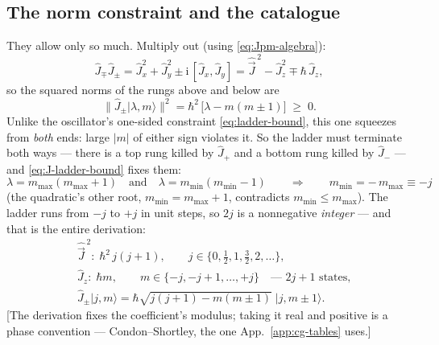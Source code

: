 \documentclass[11pt]{article}
\theoremstyle{plain}
\theoremstyle{definition}
\theoremstyle{remark}
\newcommand{\ii}{\mathrm{i}}
\newcommand{\op}[1]{\hat{#1}}
\newcommand{\ket}[1]{\lvert #1 \rangle}
\begin{document}
\subsection{The norm constraint and the catalogue}
\label{sec:J-spectrum-derivation}

They allow only so much. Multiply out (using
\eqref{eq:Jpm-algebra}):
\begin{equation}
  \op J_\mp\op J_\pm
  = \op J_x^2 + \op J_y^2
    \pm \ii\,[\op J_x, \op J_y]
  = \op{\vec J}^{\,2} - \op J_z^2 \mp \hbar\,\op J_z ,
\end{equation}
so the squared norms of the rungs above and below are
\begin{equation}
  \bigl\|\op J_\pm\ket{\lambda, m}\bigr\|^2
  = \hbar^2\,\bigl[\lambda - m(m \pm 1)\bigr]
  \;\ge\; 0 .
  \label{eq:J-ladder-bound}
\end{equation}
Unlike the oscillator's one-sided constraint
\eqref{eq:ladder-bound}, this one squeezes from \emph{both} ends:
large $|m|$ of either sign violates it. So the ladder must
terminate both ways --- there is a top rung killed by $\op J_+$ and
a bottom rung killed by $\op J_-$ --- and
\eqref{eq:J-ladder-bound} fixes them:
\begin{equation}
  \lambda = m_{\max}(m_{\max} + 1)
  \quad\text{and}\quad
  \lambda = m_{\min}(m_{\min} - 1)
  \qquad\Longrightarrow\qquad
  m_{\min} = -\,m_{\max} \equiv -j
\end{equation}
(the quadratic's other root, $m_{\min} = m_{\max} + 1$, contradicts
$m_{\min} \le m_{\max}$).
The ladder runs from $-j$ to $+j$ in unit steps, so $2j$ is a
nonnegative \emph{integer} --- and that is the entire derivation:
\begin{equation}
  \boxed{\;
  \begin{aligned}
    &\op{\vec J}^{\,2}:\;\hbar^2\, j(j+1),
    \qquad
    j \in \bigl\{0, \tfrac12, 1, \tfrac32, 2, \dots\bigr\},
    \\[2pt]
    &\op J_z:\;\hbar m,
    \qquad
    m \in \{-j, -j{+}1, \dots, +j\}
    \quad\text{--- } 2j + 1 \text{ states,}
    \\[2pt]
    &\op J_\pm\ket{j, m}
    = \hbar\sqrt{j(j+1) - m(m\pm1)}\;\ket{j, m{\pm}1}.
  \end{aligned}
  \;}
  \label{eq:J-catalogue}
\end{equation}
[The derivation fixes the coefficient's modulus; taking it real and
positive is a phase convention --- Condon--Shortley, the one
App.~\ref{app:cg-tables} uses.]
\end{document}
